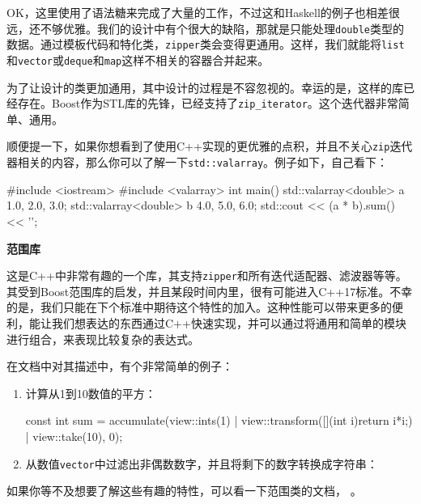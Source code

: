 OK，这里使用了语法糖来完成了大量的工作，不过这和Haskell的例子也相差很远，还不够优雅。我们的设计中有个很大的缺陷，那就是只能处理\texttt{double}类型的数据。通过模板代码和特化类，\texttt{zipper}类会变得更通用。这样，我们就能将\texttt{list}和\texttt{vector}或\texttt{deque}和\texttt{map}这样不相关的容器合并起来。

为了让设计的类更加通用，其中设计的过程是不容忽视的。幸运的是，这样的库已经存在。Boost作为STL库的先锋，已经支持了\texttt{zip\_iterator}。这个迭代器非常简单、通用。

顺便提一下，如果你想看到了使用C++实现的更优雅的点积，并且不关心\texttt{zip}迭代器相关的内容，那么你可以了解一下\texttt{std::valarray}。例子如下，自己看下：

\begin{codebox}[cpp]
#include <iostream>
#include <valarray>
int main()
{
    std::valarray<double> a {1.0, 2.0, 3.0};
    std::valarray<double> b {4.0, 5.0, 6.0};
    std::cout << (a * b).sum() << '\n';
}
\end{codebox}

\textbf{范围库}

这是C++中非常有趣的一个库，其支持\texttt{zipper}和所有迭代适配器、滤波器等等。其受到Boost范围库的启发，并且某段时间内里，很有可能进入C++17标准。不幸的是，我们只能在下个标准中期待这个特性的加入。这种性能可以带来更多的便利，能让我们想表达的东西通过C++快速实现，并可以通过将通用和简单的模块进行组合，来表现比较复杂的表达式。

在文档中对其描述中，有个非常简单的例子：

\begin{enumerate}
\item 计算从1到10数值的平方：

\begin{codebox}[cpp]
const int sum = accumulate(view::ints(1)
                        | view::transform([](int i){return i*i;})
                        | view::take(10), 0); 
\end{codebox}

\item 从数值\texttt{vector}中过滤出非偶数数字，并且将剩下的数字转换成字符串：


\end{enumerate}

如果你等不及想要了解这些有趣的特性，可以看一下范围类的文档， 。



